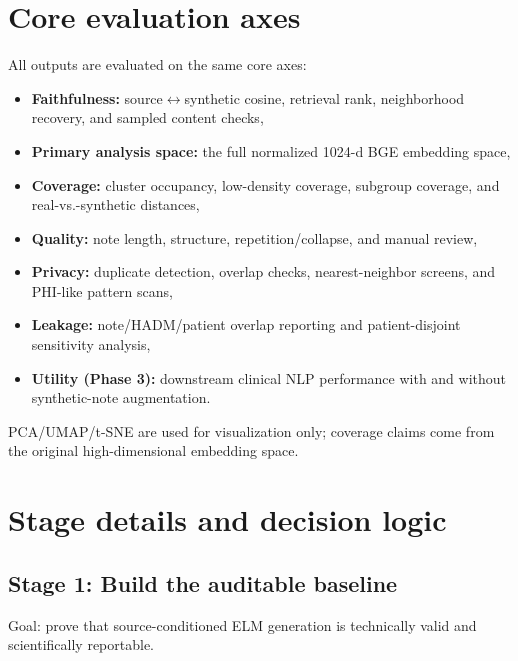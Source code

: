 \documentclass[11pt]{article}
\begin{document}
\section{Core evaluation axes}

All outputs are evaluated on the same core axes:

\begin{itemize}[nosep]
  \item \textbf{Faithfulness:} source$\leftrightarrow$synthetic cosine, retrieval rank, neighborhood recovery, and sampled content checks,
  \item \textbf{Primary analysis space:} the full normalized 1024-d BGE embedding space,
  \item \textbf{Coverage:} cluster occupancy, low-density coverage, subgroup coverage, and real-vs.-synthetic distances,
  \item \textbf{Quality:} note length, structure, repetition/collapse, and manual review,
  \item \textbf{Privacy:} duplicate detection, overlap checks, nearest-neighbor screens, and PHI-like pattern scans,
  \item \textbf{Leakage:} note/HADM/patient overlap reporting and patient-disjoint sensitivity analysis,
  \item \textbf{Utility (Phase 3):} downstream clinical NLP performance with and without synthetic-note augmentation.
\end{itemize}

PCA/UMAP/t-SNE are used for visualization only; coverage claims come from the original high-dimensional embedding space.

\section{Stage details and decision logic}

\subsection{Stage 1: Build the auditable baseline}

Goal: prove that source-conditioned ELM generation is technically valid and scientifically reportable.
\end{document}
